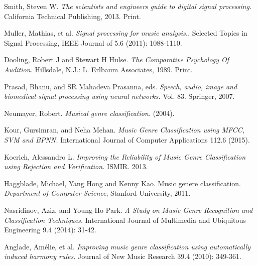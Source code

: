 \newpage
{}
\begin{thebibliography}{9}

                Smith, Steven W.
                \emph{The scientists and engineers guide to digital signal processing.}
                California Technical Publishing, 2013. Print.

                Muller, Mathias, et al. 
                \emph{Signal processing for music analysis.}, 
                Selected Topics in Signal Processing, IEEE Journal of 5.6 (2011): 1088-1110.

                Dooling, Robert J and Stewart H Hulse. 
                \emph{The Comparative Psychology Of Audition.} 
                Hillsdale, N.J.: L. Erlbaum Associates, 1989. Print.

                Prasad, Bhanu, and SR Mahadeva Prasanna, eds. 
                \emph{Speech, audio, image and biomedical signal processing using neural networks.} 
                Vol. 83. Springer, 2007.

                Neumayer, Robert. 
                \emph{Musical genre classification.} 
                (2004).

                Kour, Gursimran, and Neha Mehan. 
                \emph{Music Genre Classification using MFCC, SVM and BPNN.} 
                International Journal of Computer Applications 112.6 (2015).

                Koerich, Alessandro L. 
                \emph{Improving the Reliability of Music Genre Classification using Rejection and Verification.} 
                ISMIR. 2013.

                Haggblade, Michael, Yang Hong and Kenny Kao. Music genere classification.
                \emph{Department of Computer Science},
                Stanford University,
                2011.

                Nasridinov, Aziz, and Young-Ho Park. 
                \emph{A Study on Music Genre Recognition and Classification Techniques.} 
                International Journal of Multimedia and Ubiquitous Engineering 9.4 (2014): 31-42.

                Anglade, Amélie, et al. 
                \emph{Improving music genre classification using automatically induced harmony rules.} 
                Journal of New Music Research 39.4 (2010): 349-361.


\end{thebibliography}
